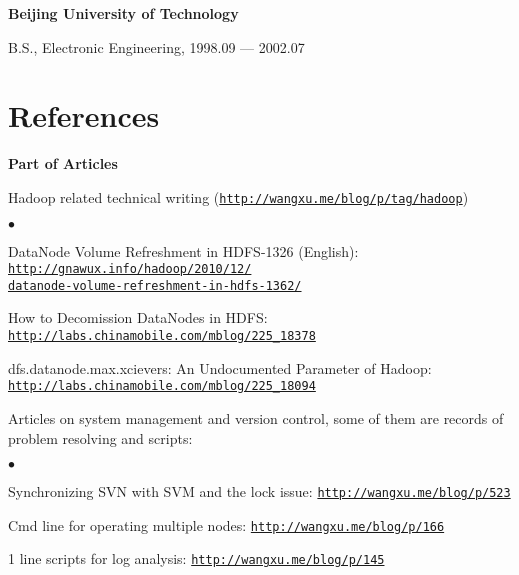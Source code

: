 \documentclass[a4paper,margin,line]{res}
\newenvironment{list1}{
  \begin{list}{\ding{113}}{%
      \setlength{\itemsep}{0in}
      \setlength{\parsep}{0in} \setlength{\parskip}{0in}
      \setlength{\topsep}{0in} \setlength{\partopsep}{0in} 
      \setlength{\leftmargin}{0.17in}}}{\end{list}}
\newenvironment{list2}{
  \begin{list}{$\bullet$}{%
      \setlength{\itemsep}{0in}
      \setlength{\parsep}{0in} \setlength{\parskip}{0in}
      \setlength{\topsep}{0in} \setlength{\partopsep}{0in} 
      \setlength{\leftmargin}{0.2in}}}{\end{list}}
\newcommand{\http}{http:/\hspace{-0.3ex}/}
\newcommand{\hindent}{\mbox{\hspace{8ex}}}
\begin{document}
\begin{resume}
{\bf Beijing University of Technology}\\
\vspace*{-.1in}
\begin{list1}
\item[] B.S., Electronic Engineering, 1998.09 --- 2002.07
\end{list1}

\section{\sc References}
\textbf{Part of Articles}\\
\vspace*{-.1in}
\begin{list1}
\item[] Hadoop related technical writing (\href{http://wangxu.me/blog/p/tag/hadoop}{\tt\http{}wangxu.me/blog/p/tag/hadoop})
\begin{list2}
\vspace*{.05in}
\item DataNode Volume Refreshment in HDFS-1326 (English):\\ 
    \hindent\href{http://gnawux.info/hadoop/2010/12/datanode-volume-refreshment-in-hdfs-1362/}{\tt\http{}gnawux.info/hadoop/2010/12/\\ \hindent\hindent{}datanode-volume-refreshment-in-hdfs-1362/}
\item How to Decomission DataNodes in HDFS: \\
	\hindent\href{http://labs.chinamobile.com/mblog/225_18378}{\tt\http{}labs.chinamobile.com/mblog/225\_18378}
\item dfs.datanode.max.xcievers: An Undocumented Parameter of Hadoop: \\
	\hindent\href{http://labs.chinamobile.com/mblog/225_18094}{\tt\http{}labs.chinamobile.com/mblog/225\_18094}
\vspace*{.05in}
\end{list2}
\item[] Articles on system management and version control, some of them are records of problem resolving and scripts:
\begin{list2}
\vspace*{.05in}
\item Synchronizing SVN with SVM and the lock issue: \href{http://wangxu.me/blog/p/523}{\tt\http{}wangxu.me/blog/p/523}
\item Cmd line for operating multiple nodes: \href{http://wangxu.me/blog/p/166}{\tt\http{}wangxu.me/blog/p/166}
\item 1 line scripts for log analysis: \href{http://wangxu.me/blog/p/145}{\tt\http{}wangxu.me/blog/p/145}
\vspace*{.05in}
\end{list2}
\end{list1}


\end{resume}
\end{document}
